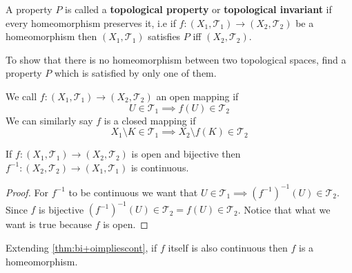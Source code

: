 \documentclass{scrartcl} %
\newcommand{\Tau}{\mathcal{T}}
\begin{document}
\begin{definition}\label{eqn:topological invariant}
	A property $P$ is called a \textbf{topological property} or \textbf{topological invariant} if every 
	homeomorphism preserves it, i.e if $f : \left(X_1, \Tau_1\right) \rightarrow \left(X_2, \Tau_2\right)$
	be a homeomorphism then $\left(X_1, \Tau_1\right)$ satisfies $P$ iff $\left(X_2, \Tau_2\right)$. 
\end{definition}
\begin{remark}
To show that there is no homeomorphism between two topological spaces, find a property $P$ which is satisfied
by only one of them.
\end{remark}
\begin{definition}
We call $f: \left(X_1, \Tau_1\right) \rightarrow \left(X_2, \Tau_2\right)$ an open mapping if
\[
U \in \Tau_1 \implies f(U) \in \Tau_2
\]
We can similarly say $f$ is a closed mapping if
\[
	X_1\setminus K \in \Tau_1 \implies X_2 \setminus f\left(K\right) \in \Tau_2
\]
\newpage
\begin{lemma}\label{thm:bi+oimpliescont}
	If $f : \left(X_1, \Tau_1\right) \rightarrow \left(X_2, \Tau_2\right)$ is open and bijective then
	$f^{-1}: \left(X_2, \Tau_2\right) \rightarrow \left(X_1, \Tau_1\right)$ is continuous.
\end{lemma}
\begin{proof}
	For $f^{-1}$ to be continuous we want that $U \in \Tau_1 \implies \left(f^{-1}\right)^{-1}(U) \in \Tau_2$.\\
	Since $f$ is bijective $ \left(f^{-1}\right)^{-1}(U) \in \Tau_2 =  f(U) \in \Tau_2$. Notice that what we want
	is true because $f$ is open.
\end{proof}
\begin{remark}
	Extending \autoref{thm:bi+oimpliescont}, if $f$ itself is also continuous then $f$ is a \\homeomorphism.
\end{remark}
\end{definition}
\end{document}
